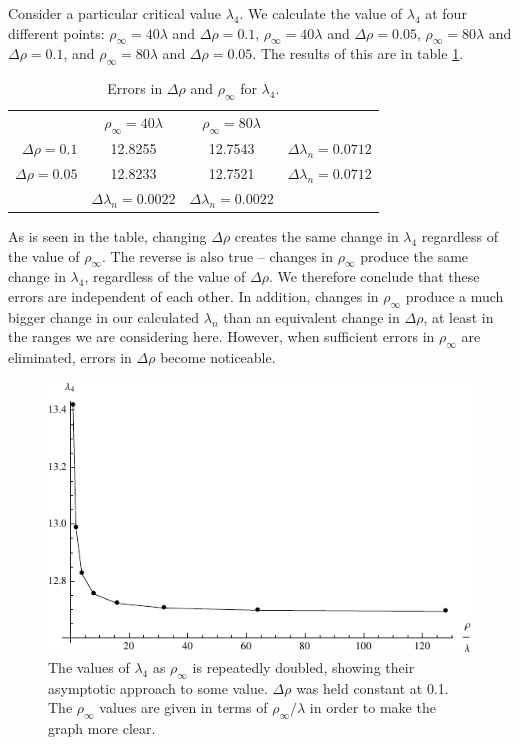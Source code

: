 \documentclass[12pt,twoside]{reedthesis}
\begin{document}
Consider a particular critical value $\lambda_{4}$. We calculate the value of $\lambda_{4}$ at four different points: $\rho_{\infty} = 40\lambda$ and $\Delta \rho = 0.1$, $\rho_{\infty} = 40\lambda$ and $\Delta \rho = 0.05$, $\rho_{\infty} = 80\lambda$ and $\Delta \rho = 0.1$, and $\rho_{\infty} = 80\lambda$ and $\Delta \rho = 0.05$. The results of this are in table \ref{tab:errorchanges}. 
\begin{table}
\centering
\begin{tabular}{r|c|c|c|}
\multicolumn{1}{r}{}
 &  \multicolumn{1}{c}{$\rho_{\infty} = 40\lambda$}
 & \multicolumn{1}{c}{$\rho_{\infty} = 80\lambda$}
 & \multicolumn{1}{l}{} \\
\cline{2-4}
$\Delta \rho = 0.1$ & 12.8255 & 12.7543 & $\Delta \lambda_n = 0.0712$\\
\cline{2-4}
$\Delta \rho = 0.05$ & 12.8233 & 12.7521& $\Delta \lambda_n = 0.0712$ \\
\cline{2-4}
\multicolumn{1}{r}{}
 &  \multicolumn{1}{|c|}{$\Delta \lambda_n = 0.0022$}
 & \multicolumn{1}{c|}{$\Delta \lambda_n = 0.0022$}
 & \multicolumn{1}{l}{} \\
 \cline{2-3}
\end{tabular}
\caption{Errors in $\Delta \rho$ and $\rho_{\infty}$ for $\lambda_4$.}
\label{tab:errorchanges}
\end{table}
As is seen in the table, changing $\Delta \rho$ creates the same change in $\lambda_4$ regardless of the value of $\rho_{\infty}$. The reverse is also true -- changes in $\rho_{\infty}$ produce the same change in $\lambda_4$, regardless of the value of $\Delta \rho$. We therefore conclude that these errors are independent of each other. In addition, changes in $\rho_{\infty}$ produce a much bigger change in our calculated $\lambda_{n}$ than an equivalent change in $\Delta \rho$, at least in the ranges we are considering here. However, when sufficient errors in $\rho_{\infty}$ are eliminated, errors in $\Delta \rho$ become noticeable.
 \begin{figure}[h]
\centering
\includegraphics{Figures/asymtote}
\caption[Asymtotic behavior of $\lambda_{4} (\rho_{\infty})$]{The values of $\lambda_{4}$ as $\rho_{\infty}$ is repeatedly doubled, showing their asymptotic approach to some value. $\Delta \rho$ was held constant at 0.1. The $\rho_{\infty}$ values are given in terms of $\rho_{\infty}/\lambda$ in order to make the graph more clear.}
\label{fig:asymtote}
\end{figure} 
\end{document}

